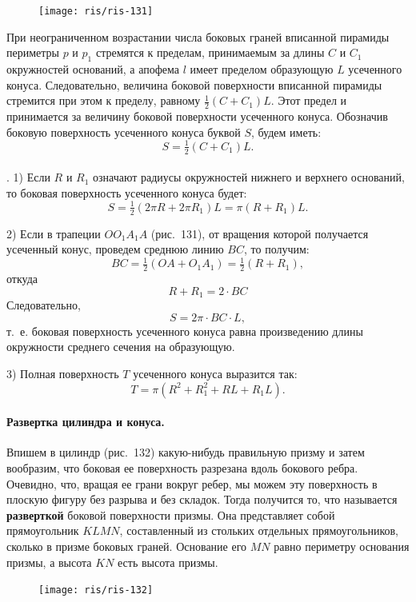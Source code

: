 \documentclass[twoside]{book}
\begin{document}
\begin{figure}[h!]
\centering
\texttt{[image: ris/ris-131]}
\caption{}
\end{figure}

При неограниченном возрастании числа боковых граней вписанной пирамиды периметры $p$ и $p_1$ стремятся к пределам, принимаемым за длины $C$ и $C_1$ окружностей оснований, а апофема $l$ имеет пределом образующую $L$ усеченного конуса.
Следовательно, величина боковой поверхности вписанной пирамиды стремится при этом к пределу, равному $\tfrac12(C + C_1)L$.
Этот предел и принимается за величину боковой поверхности усеченного конуса.
Обозначив боковую поверхность усеченного конуса буквой $S$, будем иметь:
\[S=\tfrac12 (C+C_1)L.\]

\paragraph{}\label{1938/s117}
. 1) Если $R$ и $R_1$ означают радиусы окружностей нижнего и верхнего оснований, то боковая поверхность усеченного конуса будет:
\[S = \tfrac12(2\pi R + 2\pi R_1)L = \pi (R + R_1)L.\]

2) Если в трапеции $OO_1A_1A$ (рис.~131), от вращения которой получается усеченный конус, проведем среднюю линию $BC$, то получим:
\[BC = \tfrac12(OA + O_1A_1) = \tfrac12(R + R_1),\]
откуда
\[R + R_1=2\cdot BC\]
Следовательно,
\[S = 2\pi\cdot BC\cdot L,\]
т.~е. боковая поверхность усеченного конуса равна произведению длины окружности среднего сечения на образующую.

3) Полная поверхность $T$ усеченного конуса выразится так:
\[T = \pi (R^2 + R_1^2 + RL + R_1L).\]

\paragraph{Развертка цилиндра и конуса.}\label{1938/s118}
Впишем в цилиндр (рис.~132) какую-нибудь правильную призму и затем вообразим, что боковая ее поверхность разрезана вдоль бокового ребра.
Очевидно, что, вращая ее грани вокруг ребер, мы можем  эту поверхность в плоскую фигуру без разрыва и без складок.
Тогда получится то, что называется \textbf{разверткой} боковой поверхности призмы.
Она представляет собой прямоугольник $KLMN$, составленный из стольких отдельных прямоугольников, сколько в призме боковых граней.
Основание его $MN$ равно периметру основания призмы, а высота $KN$ есть высота призмы.

\begin{figure}[h!]
\centering
\texttt{[image: ris/ris-132]}
\caption{}
\end{figure}
\end{document}
